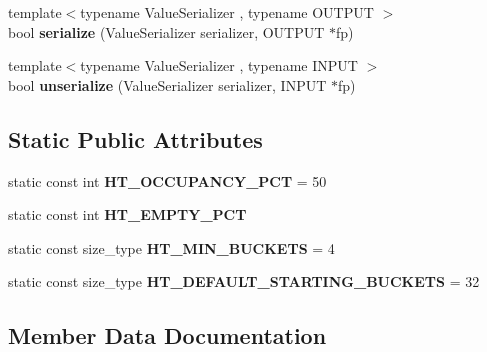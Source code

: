 \begin{DoxyCompactItemize}
\item 
{\footnotesize template$<$typename Value\+Serializer , typename O\+U\+T\+P\+UT $>$ }\\bool {\bfseries serialize} (Value\+Serializer serializer, O\+U\+T\+P\+UT $\ast$fp)\hypertarget{classspp___1_1sparse__hashtable_a5ae44879fc0a719017c4d850720d07b1}{}\label{classspp___1_1sparse__hashtable_a5ae44879fc0a719017c4d850720d07b1}

\item 
{\footnotesize template$<$typename Value\+Serializer , typename I\+N\+P\+UT $>$ }\\bool {\bfseries unserialize} (Value\+Serializer serializer, I\+N\+P\+UT $\ast$fp)\hypertarget{classspp___1_1sparse__hashtable_a1dcb031b78ab27a4d10e1819f73358b0}{}\label{classspp___1_1sparse__hashtable_a1dcb031b78ab27a4d10e1819f73358b0}

\end{DoxyCompactItemize}
\subsection*{Static Public Attributes}
\begin{DoxyCompactItemize}
\item 
static const int {\bfseries H\+T\+\_\+\+O\+C\+C\+U\+P\+A\+N\+C\+Y\+\_\+\+P\+CT} = 50\hypertarget{classspp___1_1sparse__hashtable_ac13ec6c4c2ef8ffff799e9086220d6c3}{}\label{classspp___1_1sparse__hashtable_ac13ec6c4c2ef8ffff799e9086220d6c3}

\item 
static const int {\bfseries H\+T\+\_\+\+E\+M\+P\+T\+Y\+\_\+\+P\+CT}
\item 
static const size\+\_\+type {\bfseries H\+T\+\_\+\+M\+I\+N\+\_\+\+B\+U\+C\+K\+E\+TS} = 4\hypertarget{classspp___1_1sparse__hashtable_a2d4214f38ddbe5f2ac97c910d916effd}{}\label{classspp___1_1sparse__hashtable_a2d4214f38ddbe5f2ac97c910d916effd}

\item 
static const size\+\_\+type {\bfseries H\+T\+\_\+\+D\+E\+F\+A\+U\+L\+T\+\_\+\+S\+T\+A\+R\+T\+I\+N\+G\+\_\+\+B\+U\+C\+K\+E\+TS} = 32\hypertarget{classspp___1_1sparse__hashtable_add003723127020bae7a9f2c62116c322}{}\label{classspp___1_1sparse__hashtable_add003723127020bae7a9f2c62116c322}

\end{DoxyCompactItemize}


\subsection{Member Data Documentation}
